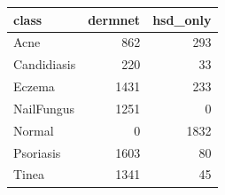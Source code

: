 \begin{tabular}{lrr}
\toprule
class & dermnet & hsd\_only \\
\midrule
Acne & 862 & 293 \\
Candidiasis & 220 & 33 \\
Eczema & 1431 & 233 \\
NailFungus & 1251 & 0 \\
Normal & 0 & 1832 \\
Psoriasis & 1603 & 80 \\
Tinea & 1341 & 45 \\
\bottomrule
\end{tabular}
